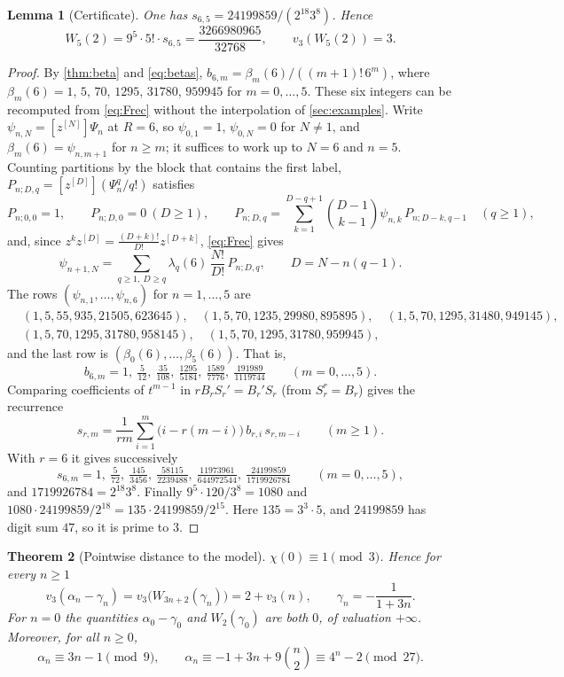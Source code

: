\documentclass[11pt,reqno]{amsart}
\newtheorem{theorem}{Theorem}[section]
\newtheorem{lemma}[theorem]{Lemma}
\theoremstyle{definition}
\theoremstyle{remark}
\theoremstyle{plain}
\newcommand{\hc}[1]{[z^{[#1]}]}
\begin{document}
\begin{lemma}[Certificate]\label{lem:certificate}
One has $s_{6,5}=24199859/(2^{18}3^8)$. Hence
\[
W_5(2)=9^5\cdot5!\cdot s_{6,5}=\frac{3266980965}{32768},\qquad v_3(W_5(2))=3.
\]
\end{lemma}

\begin{proof}
By \cref{thm:beta} and \eqref{eq:betas}, $b_{6,m}=\beta_m(6)/((m+1)!\,6^m)$, where $\beta_m(6)=1$, $5$, $70$, $1295$, $31780$, $959945$ for $m=0,\dots,5$. These six integers can be recomputed from \eqref{eq:Frec} without the interpolation of \cref{sec:examples}. Write $\psi_{n,N}=\hc N\Psi_n$ at $R=6$, so $\psi_{0,1}=1$, $\psi_{0,N}=0$ for $N\ne1$, and $\beta_m(6)=\psi_{n,m+1}$ for $n\ge m$; it suffices to work up to $N=6$ and $n=5$. Counting partitions by the block that contains the first label, $P_{n;D,q}=\hc D(\Psi_n^q/q!)$ satisfies
\[
P_{n;0,0}=1,\qquad P_{n;D,0}=0\ (D\ge1),\qquad P_{n;D,q}=\sum_{k=1}^{D-q+1}\binom{D-1}{k-1}\psi_{n,k}\,P_{n;D-k,q-1}\quad(q\ge1),
\]
and, since $z^kz^{[D]}=\frac{(D+k)!}{D!}z^{[D+k]}$, \eqref{eq:Frec} gives
\[
\psi_{n+1,N}=\sum_{q\ge1,\ D\ge q}\lambda_q(6)\,\frac{N!}{D!}\,P_{n;D,q},\qquad D=N-n(q-1).
\]
The rows $(\psi_{n,1},\dots,\psi_{n,6})$ for $n=1,\dots,5$ are
\[
\begin{aligned}
&(1,5,55,935,21505,623645),\quad (1,5,70,1235,29980,895895),\quad (1,5,70,1295,31480,949145),\\
&(1,5,70,1295,31780,958145),\quad (1,5,70,1295,31780,959945),
\end{aligned}
\]
and the last row is $(\beta_0(6),\dots,\beta_5(6))$. That is,
\[
b_{6,m}=1,\ \tfrac5{12},\ \tfrac{35}{108},\ \tfrac{1295}{5184},\ \tfrac{1589}{7776},\ \tfrac{191989}{1119744}\qquad(m=0,\dots,5).
\] Comparing coefficients of $t^{m-1}$ in $rB_rS_r'=B_r'S_r$ (from $S_r^r=B_r$) gives the recurrence
\begin{equation}\label{eq:srec}
s_{r,m}=\frac1{rm}\sum_{i=1}^m\bigl(i-r(m-i)\bigr)\,b_{r,i}\,s_{r,m-i}\qquad(m\ge1).
\end{equation}
With $r=6$ it gives successively
\[
s_{6,m}=1,\ \tfrac5{72},\ \tfrac{145}{3456},\ \tfrac{58115}{2239488},\ \tfrac{11973961}{644972544},\ \tfrac{24199859}{1719926784}\qquad(m=0,\dots,5),
\]
and $1719926784=2^{18}3^8$. Finally $9^5\cdot120/3^8=1080$ and $1080\cdot24199859/2^{18}=135\cdot24199859/2^{15}$. Here $135=3^3\cdot5$, and $24199859$ has digit sum $47$, so it is prime to $3$.
\end{proof}

\begin{theorem}[Pointwise distance to the model]\label{thm:pointwise}
$\chi(0)\equiv1\pmod 3$. Hence for every $n\ge1$
\[
v_3(\alpha_n-\gamma_n)=v_3\bigl(W_{3n+2}(\gamma_n)\bigr)=2+v_3(n),\qquad\gamma_n=-\frac1{1+3n}.
\]
For $n=0$ the quantities $\alpha_0-\gamma_0$ and $W_2(\gamma_0)$ are both $0$, of valuation $+\infty$. Moreover, for all $n\ge0$,
\[
\alpha_n\equiv3n-1\pmod 9,\qquad \alpha_n\equiv-1+3n+9\binom n2\equiv4^n-2\pmod{27}.
\]
\end{theorem}
\end{document}
